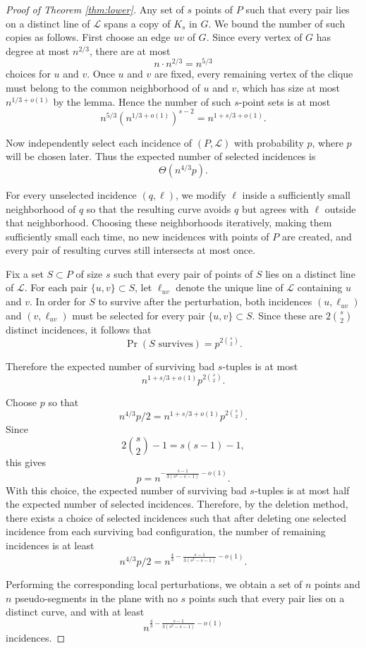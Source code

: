 \documentclass[11pt]{article}
\theoremstyle{plain}
\theoremstyle{definition}
\theoremstyle{remark}
\begin{document}
\begin{proof}[Proof of Theorem \ref{thm:lower}]
Any set of \(s\) points of \(P\) such that every pair lies on a distinct line of \(\mathcal L\) spans a copy of \(K_s\) in \(G\). We bound the number of such copies as follows. First choose an edge \(uv\) of \(G\). Since every vertex of \(G\) has degree at most \(n^{2/3}\), there are at most
\[
n\cdot n^{2/3}=n^{5/3}
\]
choices for \(u\) and \(v\). Once \(u\) and \(v\) are fixed, every remaining vertex of the clique must belong to the common neighborhood of \(u\) and \(v\), which has size at most \(n^{1/3+o(1)}\) by the lemma. Hence the number of such \(s\)-point sets is at most
\[
n^{5/3}\left(n^{1/3+o(1)}\right)^{s-2}
=
n^{1+s/3+o(1)}.
\]

Now independently select each incidence of \((P,\mathcal L)\) with probability \(p\), where \(p\) will be chosen later. Thus the expected number of selected incidences is
\[
\Theta(n^{4/3}p).
\]

For every unselected incidence \((q,\ell)\), we modify \(\ell\) inside a sufficiently small neighborhood of \(q\) so that the resulting curve avoids \(q\) but agrees with \(\ell\) outside that neighborhood. Choosing these neighborhoods iteratively, making them sufficiently small each time, no new incidences with points of \(P\) are created, and every pair of resulting curves still intersects at most once.

Fix a set \(S\subset P\) of size \(s\) such that every pair of points of \(S\) lies on a distinct line of \(\mathcal L\). For each pair \(\{u,v\}\subset S\), let \(\ell_{uv}\) denote the unique line of \(\mathcal L\) containing \(u\) and \(v\). In order for \(S\) to survive after the perturbation, both incidences \((u,\ell_{uv})\) and \((v,\ell_{uv})\) must be selected for every pair \(\{u,v\}\subset S\). Since these are \(2\binom{s}{2}\) distinct incidences, it follows that
\[
\Pr(S\text{ survives})=p^{2\binom{s}{2}}.
\]

\noindent Therefore the expected number of surviving bad \(s\)-tuples is at most
\[
n^{1+s/3+o(1)}p^{2\binom{s}{2}}.
\]

\noindent Choose \(p\) so that
\[
n^{4/3}p/2
=
n^{1+s/3+o(1)}p^{2\binom{s}{2}}.
\]
Since
\[
2\binom{s}{2}-1=s(s-1)-1,
\]
this gives
\[
p
=
n^{-\frac{s-1}{3(s^2-s-1)}-o(1)}.
\]
With this choice, the expected number of surviving bad \(s\)-tuples is at most half the expected number of selected incidences. Therefore, by the deletion method, there exists a choice of selected incidences such that after deleting one selected incidence from each surviving bad configuration, the number of remaining incidences is at least
\[
n^{4/3}p/2
=
n^{\frac43-\frac{s-1}{3(s^2-s-1)}-o(1)}.
\]

Performing the corresponding local perturbations, we obtain a set of \(n\) points and \(n\) pseudo-segments in the plane with no \(s\) points such that every pair lies on a distinct curve, and with at least
\[
n^{\frac43-\frac{s-1}{3(s^2-s-1)}-o(1)}
\]
incidences. 
\end{proof}
\end{document}
